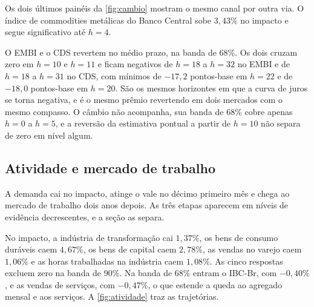 \documentclass[
article,			%
12pt,				%
oneside,			%
a4paper,			%
hidelinks, 
english,			%
brazil,				%
]{abntex2}
\theoremstyle{plain}
\theoremstyle{definition}
\theoremstyle{remark}
\begin{document}

Os dois últimos painéis da \autoref{fig:cambio} mostram o mesmo canal por outra via. O índice de commodities metálicas do Banco Central sobe $3{,}43\%$ no impacto e segue significativo até $h = 4$. %

O EMBI e o CDS revertem no médio prazo, na banda de 68\%. Os dois cruzam zero em $h = 10$ e $h = 11$ e ficam negativos de $h = 18$ a $h = 32$ no EMBI e de $h = 18$ a $h = 31$ no CDS, com mínimos de $-17{,}2$ pontos-base em $h = 22$ e de $-18{,}0$ pontos-base em $h = 20$. São os mesmos horizontes em que a curva de juros se torna negativa, e é o mesmo prêmio revertendo em dois mercados com o mesmo compasso. O câmbio não acompanha, sua banda de 68\% cobre apenas $h = 0$ a $h = 5$, e a reversão da estimativa pontual a partir de $h = 10$ não separa de zero em nível algum.


\subsection{Atividade e mercado de trabalho}

A demanda cai no impacto, atinge o vale no décimo primeiro mês e chega ao mercado de trabalho dois anos depois. As três etapas aparecem em níveis de evidência decrescentes, e a seção as separa.

No impacto, a indústria de transformação cai $1{,}37\%$, os bens de consumo duráveis caem $4{,}67\%$, os bens de capital caem $2{,}78\%$, as vendas no varejo caem $1{,}06\%$ e as horas trabalhadas na indústria caem $1{,}08\%$. As cinco respostas excluem zero na banda de 90\%. Na banda de 68\% entram o IBC-Br, com $-0{,}40\%$, e as vendas de serviços, com $-0{,}47\%$, o que estende a queda ao agregado mensal e aos serviços. A \autoref{fig:atividade} traz as trajetórias.
\end{document}
